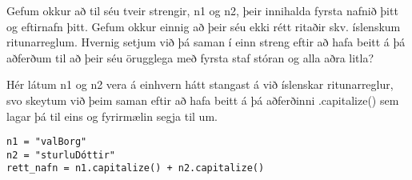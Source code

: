 \begin{exercise}\label{str7}
Gefum okkur að til séu tveir strengir, n1 og n2, þeir innihalda fyrsta nafnið þitt og eftirnafn þitt.
Gefum okkur einnig að þeir séu ekki rétt ritaðir skv. íslenskum ritunarreglum.
Hvernig setjum við þá saman í einn streng eftir að hafa beitt á þá aðferðum til að þeir séu örugglega með fyrsta staf stóran og alla aðra litla?
\end{exercise}
\begin{Answer}[ref={str7}]
	Hér látum n1 og n2 vera á einhvern hátt stangast á við íslenskar ritunarreglur, svo skeytum við þeim saman eftir að hafa beitt á þá aðferðinni .capitalize() sem lagar þá til eins og fyrirmælin segja til um.
\begin{lstlisting}
n1 = "valBorg"
n2 = "sturluDóttir"
rett_nafn = n1.capitalize() + n2.capitalize()\end{lstlisting}
\end{Answer}

